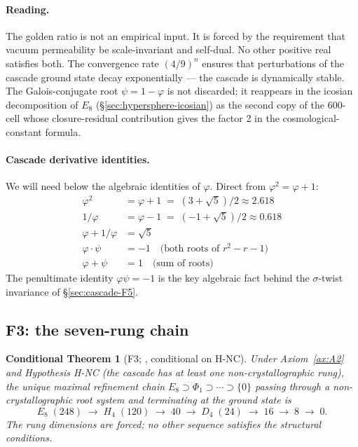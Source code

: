 \documentclass[11pt]{article}
\theoremstyle{plain}
\newtheorem{conditional}[theorem]{Conditional Theorem}
\theoremstyle{definition}
\theoremstyle{remark}
\begin{document}
\paragraph{Reading.} The golden ratio is not an empirical input. It is forced by the requirement that vacuum permeability be scale-invariant and self-dual. No other positive real satisfies both. The convergence rate $(4/9)^n$ ensures that perturbations of the cascade ground state decay exponentially --- the cascade is dynamically stable. The Galois-conjugate root $\psi = 1 - \varphi$ is not discarded; it reappears in the icosian decomposition of $E_8$ (\S\ref{sec:hypersphere-icosian}) as the second copy of the 600-cell whose closure-residual contribution gives the factor 2 in the cosmological-constant formula.

\paragraph{Cascade derivative identities.} We will need below the algebraic identities of $\varphi$. Direct from $\varphi^2 = \varphi + 1$:
\begin{align}
  \varphi^2 &= \varphi + 1 \;=\; (3 + \sqrt 5)/2 \approx 2.618 \\
  1/\varphi &= \varphi - 1 \;=\; (-1 + \sqrt 5)/2 \approx 0.618 \\
  \varphi + 1/\varphi &= \sqrt 5 \\
  \varphi \cdot \psi &= -1 \quad\text{(both roots of }r^2 - r - 1\text{)} \\
  \varphi + \psi &= 1 \quad\text{(sum of roots)}
\end{align}
The penultimate identity $\varphi \psi = -1$ is the key algebraic fact behind the $\sigma$-twist invariance of \S\ref{sec:cascade-F5}.

\subsection{F3: the seven-rung chain}

\begin{conditional}[F3; \citealp{SmartXXXVI}, conditional on H-NC]\label{thm:F3}
Under Axiom~\ref{ax:A2} and Hypothesis H-NC (the cascade has at least one non-crystallographic rung), the unique maximal refinement chain $E_8 \supset \Phi_1 \supset \cdots \supset \{0\}$ passing through a non-crystallographic root system and terminating at the ground state is
\[
  E_8 \;(248) \;\longrightarrow\; H_4 \;(120) \;\longrightarrow\; 40 \;\longrightarrow\; D_4 \;(24) \;\longrightarrow\; 16 \;\longrightarrow\; 8 \;\longrightarrow\; 0.
\]
The rung dimensions are forced; no other sequence satisfies the structural conditions.
\end{conditional}
\end{document}
